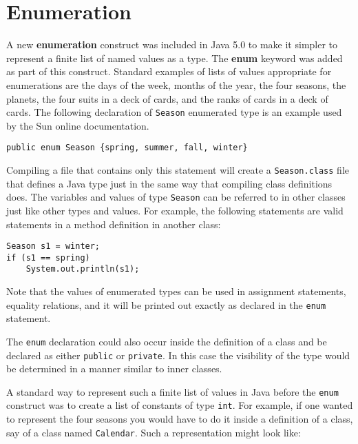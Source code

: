 \section*{Enumeration}
\noindent A new {\bf enumeration} construct was included in Java 5.0 to make 
it simpler to represent a finite list of named values as a type. The
{\bf enum} keyword was added as part of this construct. Standard
examples of lists of values appropriate for enumerations are the days
of the week, months of the year, the four seasons, the planets, the
four suits in a deck of cards, and the ranks of cards in a deck of
cards. The following declaration of {\tt Season} enumerated type is an
example used by the Sun online documentation.

\begin{jjjlisting}
\begin{lstlisting}
public enum Season {spring, summer, fall, winter}
\end{lstlisting}
\end{jjjlisting}

\noindent Compiling a file that contains only this statement will create a
{\tt Season.class} file that defines a Java type just in the same way
that compiling class definitions does.  The variables and values of type
{\tt Season} can be referred to in other classes just like other types and
values. For example, the following statements are valid statements in 
a method definition in another class:

\begin{jjjlisting}
\begin{lstlisting}
Season s1 = winter;
if (s1 == spring)
    System.out.println(s1);    
\end{lstlisting}
\end{jjjlisting}

\noindent Note that the values of enumerated types can be used in 
assignment  statements, equality relations, and it will be printed out exactly
as declared in the {\tt enum} statement.

The {\tt enum} declaration could also occur inside the definition of a
class and be declared as either {\tt public} or {\tt private}. In this case the 
visibility of the type would be determined in a manner similar to inner classes.

A standard way to represent such a finite list of values in Java before the
{\tt enum} construct was to create a list of constants of type {\tt int}.
For example, if one wanted to represent the four seasons you would have to do 
it inside a definition of a class, say of a class named {\tt Calendar}.
Such a representation might look like:

